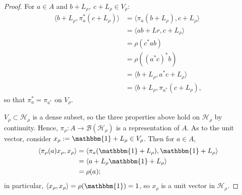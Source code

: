 \documentclass[12pt,a4paper]{amsart}
\theoremstyle{plain}
\theoremstyle{definition}
\newcommand{\B}{\mathcal{B}}
\newcommand{\Hr}{\mathcal{H}_\rho}
\newcommand{\1}{\mathbbm{1}}
\newcommand{\Vr}{V_\rho}
\newcommand{\Lr}{L_\rho}
\newcommand{\xr}{x_\rho}
\begin{document}
\begin{proof}
	
	For $a\in A$ and $b+ L_\rho,~c+ L_\rho \in \Vr$:
	\begin{align*}
				\langle b+\Lr, \pi_a^\ast (c+\Lr) \rangle 
		&=		\langle \pi_a (b+\Lr), c+\Lr \rangle						\\
		&=		\langle ab +Lr, c+\Lr \rangle								\\
		&=		\rho(c^\ast ab)												\\
		&=		\rho((a^\ast c)^\ast b)										\\
		&=		\langle b+\Lr, a^\ast c+\Lr \rangle							\\
		&=		\langle b+\Lr, \pi_{a^\ast}(c+\Lr),
	\end{align*}
	so that $ \pi_a^\ast = \pi_{a^\ast}$ on $\Vr$.
	
	$\Vr \subset \Hr$ is a dense subset, so the three properties above hold on 
	$\Hr$ by continuity.  Hence, $\pi_\rho: A \to \B(\Hr)$ is a representation of $A$.
	As to the unit vector, consider $\xr := \1 + \Lr \in \Vr$. Then for $a \in A$,
	\begin{align*}
				\langle \pi_\rho(a)\xr ,\xr \rangle 
		&=		\langle \pi_a(\1+\Lr), \1+\Lr \rangle						\\
		&=		\langle a+\Lr \1+\Lr \rangle								\\
		&=		\rho(a);
	\end{align*}
	in particular, $\langle \xr,\xr \rangle = \rho (\1) = 1$, so $\xr$ is a unit vector in $\Hr$.	
\end{proof}
\end{document}

